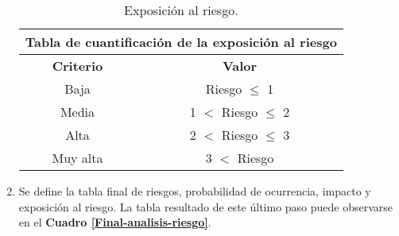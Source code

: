 \begin{enumerate}
    \begin{table}[h]
        \centering
        \begin{tabular}{|c|c|}
            \hline
            \multicolumn{2}{|c|}{{\bf Tabla de cuantificación de la exposición al riesgo}}  \\ \hline
            {\bf Criterio}      & {\bf Valor}                                               \\ \hline
             Baja      & Riesgo $\leq$ 1          \\ \hline
             Media     & 1 $<$ Riesgo $\leq$ 2    \\ \hline
             Alta      & 2 $<$ Riesgo $\leq$ 3    \\ \hline
             Muy alta  & 3 $<$ Riesgo             \\ \hline
        \end{tabular}
        \caption{Exposición al riesgo.}
        \label{Riesgo-exposicion}
    \end{table}
    
    \item Se define la tabla final de riesgos, probabilidad de ocurrencia, impacto y exposición al riesgo. 
    La tabla resultado de este último paso puede observarse en el \textbf{Cuadro \ref{Final-analisis-riesgo}}.
    

\end{enumerate}
